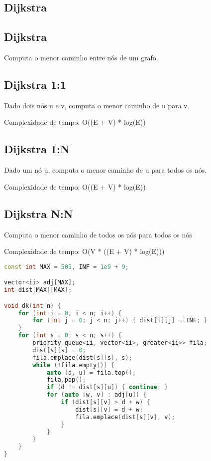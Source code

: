 \documentclass[11pt, a4paper, twoside]{article}
\begin{document}
\subsection{Dijkstra}

\subsection{Dijkstra}


Computa o menor caminho entre nós de um grafo.

\subsection{Dijkstra 1:1}


Dado dois nós u e v, computa o menor caminho de u para v.

Complexidade de tempo: O((E + V) * log(E))

\subsection{Dijkstra 1:N}


Dado um nó u, computa o menor caminho de u para todos os nós.

Complexidade de tempo: O((E + V) * log(E))

\subsection{Dijkstra N:N}


Computa o menor caminho de todos os nós para todos os nós

Complexidade de tempo: O(V * ((E + V) * log(E)))

\begin{lstlisting}[language=C++]
const int MAX = 505, INF = 1e9 + 9;

vector<ii> adj[MAX];
int dist[MAX][MAX];

void dk(int n) {
    for (int i = 0; i < n; i++) {
        for (int j = 0; j < n; j++) { dist[i][j] = INF; }
    }
    for (int s = 0; s < n; s++) {
        priority_queue<ii, vector<ii>, greater<ii>> fila;
        dist[s][s] = 0;
        fila.emplace(dist[s][s], s);
        while (!fila.empty()) {
            auto [d, u] = fila.top();
            fila.pop();
            if (d != dist[s][u]) { continue; }
            for (auto [w, v] : adj[u]) {
                if (dist[s][v] > d + w) {
                    dist[s][v] = d + w;
                    fila.emplace(dist[s][v], v);
                }
            }
        }
    }
}
\end{lstlisting}
\end{document}
